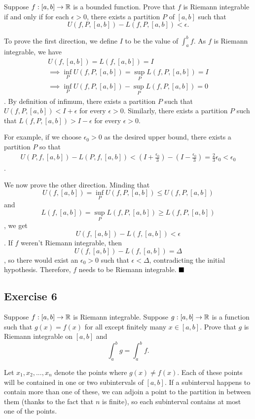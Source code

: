 \begin{formulationBox}
	Suppose $f:[a,b]\rightarrow\mathbb{R}$ is a bounded function. Prove that $f$ is Riemann integrable if and only if for each $\epsilon>0$, there exists a partition $P$ of $[a,b]$ such that \[U(f,P,[a,b]) - L(f,P,[a,b]) < \epsilon.\]
\end{formulationBox}

To prove the first direction, we define $I$ to be the value of $\int_{a}^{b}f$. As $f$ is Riemann integrable, we have \begin{align*}
	U(f,[a,b])=L(f,[a,b])=I\\
	\implies\inf_PU(f,P,[a,b])=\sup_PL(f,P,[a,b])=I\\ \implies\inf_PU(f,P,[a,b])-\sup_PL(f,P,[a,b])=0
\end{align*}.
By definition of infimum, there exists a partition $P$ such that $U(f,P,[a,b])< I+\epsilon$ for every $\epsilon>0$. Similarly, there exists a partition $P$ such that $L(f,P,[a,b])>I-\epsilon$ for every $\epsilon>0$.

For example, if we choose $\epsilon_0>0$ as the desired upper bound, there exists a partition $P$ so that
\begin{align*}
	U(P,f,[a,b])-L(P,f,[a,b])<(I+\frac{\epsilon_0}{3})-(I-\frac{\epsilon_0}{3})=\frac{2}{3}\epsilon_0 < \epsilon_0
\end{align*}.

We now prove the other direction. Minding that \[U(f,[a,b])=\inf_PU(f,P,[a,b])\leq U(f,P,[a,b])\] and \[L(f,[a,b])=\sup_PL(f,P,[a,b])\geq L(f,P,[a,b])\], we get \[U(f,[a,b])-L(f,[a,b])<\epsilon\]. If $f$ weren't Riemann integrable, then \[U(f,[a,b])-L(f,[a,b])=\Delta\], so there would exist an $\epsilon_0>0$ such that $\epsilon<\Delta$, contradicting the initial hypothesis. Therefore, $f$ needs to be Riemann integrable.
$\qed$

\subsection{Exercise 6}

\begin{formulationBox}
	Suppose $f:[a,b]\rightarrow\mathbb{R}$ is Riemann integrable. Suppose $g:[a,b]\rightarrow\mathbb{R}$ is a function such that $g(x) = f(x)$ for all except finitely many $x\in[a,b]$. Prove that $g$ is Riemann integrable on $[a,b]$ and \[\int_a^bg=\int_a^bf.\]
\end{formulationBox}

Let $x_1, x_2, ..., x_n$ denote the points where $g(x)\neq f(x)$. Each of these points will be contained in one or two subintervals of $[a,b]$. If a subinterval happens to contain more than one of these, we can adjoin a point to the partition in between them (thanks to the fact that $n$ is finite), so each subinterval contains at most one of the points.

